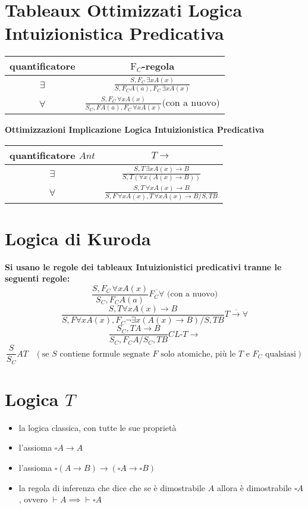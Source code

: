 \documentclass[a4paper,12pt, oneside]{book}
\begin{document}
\section*{Tableaux Ottimizzati Logica Intuizionistica Predicativa}
\begin{table}[H]
  \centering
  \Large
  \begin{tabular}{c||c}
    quantificatore & $\mbox{F}_C$-regola\\
    \hline
    $\exists$ & $\frac{S,F_C\,\exists x A(x)}{S,F_CA(a),F_C\,\exists x A(x)}$\\
    \hline
    $\forall$ & $\frac{S,F_C\,\forall x A(x)}{S_C,FA(a), F_C\,\forall xA(x)}
                \mbox{(con a nuovo)}$
  \end{tabular}
\end{table}
\begin{center}
  \textbf{Ottimizzazioni Implicazione Logica Intuizionistica Predicativa}
\end{center}
\begin{table}[H]
  \centering
  \Large
  \begin{tabular}{c||c}
    quantificatore $Ant$ & $T\to$\\
    \hline
    $\exists$ & $\frac{S,T\,\exists x A(x)\to B}{S,T(\forall x(A(x)\to B))}$\\
    \hline
    $\forall$ & $\frac{S,T\,\forall x A(x)\to B}{S,F\,\forall xA(x),T\,\forall
                xA(x)\to B/ S, TB}$
  \end{tabular}
\end{table}
\newpage
\section*{Logica di Kuroda}
\textbf{Si usano le regole dei tableaux Intuizionistici predicativi tranne le
  seguenti regole:}
\[\frac{S,F_C\,\forall x A(x)}{S_C,F_CA(a)}\overline{F_C\forall}\mbox{ (con a
    nuovo)}\]
\[\frac{S,T\forall xA(x)\to B}{S, F\forall x A(x), F_C\neg\exists x (A(x)\to B)/
    S, TB}\overline{T\to\forall}\]
\[\frac{S_C, TA\to B}{S_C, F_CA/S_C, TB}CL\mbox{-}T\to\]
\[\frac{S}{S_C}AT\,\,\,\,\, (\mbox{se $S$ contiene formule segnate $F$ solo
    atomiche, più le $T$ e $F_C$ qualsiasi})\]
\section*{Logica $T$}
\begin{itemize}
  \item la logica classica, con tutte le sue proprietà
  \item l'assioma $\square A\to A$
  \item l'assioma $\square(A\to B)\to(\square A\to\square B)$
  \item la regola di inferenza che dice che se è dimostrabile $A$ allora è
  dimostrabile $\square A$, ovvero $\vdash A\implies \vdash \square A$
\end{itemize}
\end{document}
